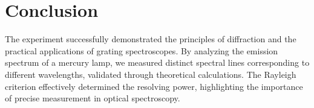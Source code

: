 \section{Conclusion}

The experiment successfully demonstrated the principles of diffraction and the practical applications of grating spectroscopes. By analyzing the emission spectrum of a mercury lamp, we measured distinct spectral lines corresponding to different wavelengths, validated through theoretical calculations. The Rayleigh criterion effectively determined the resolving power, highlighting the importance of precise measurement in optical spectroscopy.